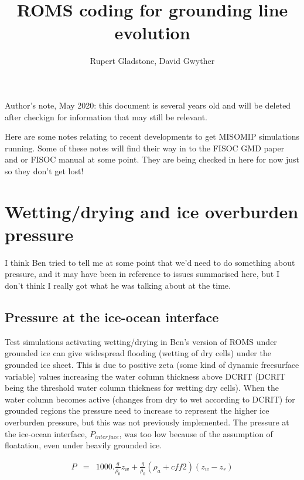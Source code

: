 \documentclass[12pt]{article}
\begin{document}
\title{ROMS coding for grounding line evolution}
\author{Rupert Gladstone, David Gwyther}
\maketitle{}

Author's note, May 2020: this document is several years old and will be deleted after checkign for information
that may still be relevant.

Here are some notes relating to recent developments to get MISOMIP simulations running.
Some of these notes will find their way in to the FISOC 
GMD paper and or FISOC manual at some point.
They are being checked in here for now just so they don't get lost!


\section{Wetting/drying and ice overburden pressure}

I think Ben tried to tell me at some point that we'd need to do something about pressure, and it may have been in reference to  issues
summarised here, but I don't think I really got what he was talking about at the time.




\subsection{Pressure at the ice-ocean interface}

Test simulations activating wetting/drying in Ben's version of ROMS under grounded ice can give widespread flooding (wetting of dry cells) 
under the grounded ice sheet.
This is due to positive zeta (some kind of dynamic freesurface variable) values increasing the water column thickness above DCRIT (DCRIT being the threshold 
water column thickness for wetting dry cells). 
When the water column becomes active (changes from dry to wet according to DCRIT) for grounded regions the pressure need to increase to represent the 
higher ice overburden pressure, but this was not previously implemented.
The pressure at the ice-ocean interface, $P_{interface}$, was too low because of the assumption of floatation, even under heavily 
grounded ice.  


\begin{eqnarray}
P & = & 1000. \frac{g}{\rho_0}z_w + \frac{g}{\rho_0}(\rho_a+cff2)(z_w-z_r)
\end{eqnarray}
\end{document}
